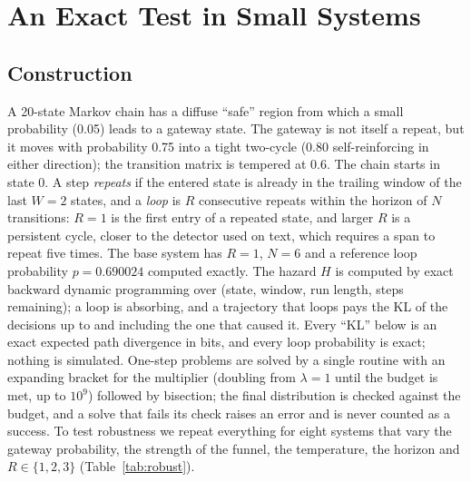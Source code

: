 \section{An Exact Test in Small Systems}\label{sec:small}

\subsection{Construction}
A 20-state Markov chain has a diffuse ``safe'' region from which a small probability (0.05) leads to a gateway state. The gateway is not itself a repeat, but it moves with probability 0.75 into a tight two-cycle (0.80 self-reinforcing in either direction); the transition matrix is tempered at 0.6. The chain starts in state 0. A step \emph{repeats} if the entered state is already in the trailing window of the last $W=2$ states, and a \emph{loop} is $R$ consecutive repeats within the horizon of $N$ transitions: $R=1$ is the first entry of a repeated state, and larger $R$ is a persistent cycle, closer to the detector used on text, which requires a span to repeat five times. The base system has $R=1$, $N=6$ and a reference loop probability $p=0.690024$ computed exactly. The hazard $H$ is computed by exact backward dynamic programming over (state, window, run length, steps remaining); a loop is absorbing, and a trajectory that loops pays the KL of the decisions up to and including the one that caused it. Every ``KL'' below is an exact expected path divergence in bits, and every loop probability is exact; nothing is simulated. One-step problems are solved by a single routine with an expanding bracket for the multiplier (doubling from $\lambda=1$ until the budget is met, up to $10^9$) followed by bisection; the final distribution is checked against the budget, and a solve that fails its check raises an error and is never counted as a success. To test robustness we repeat everything for eight systems that vary the gateway probability, the strength of the funnel, the temperature, the horizon and $R\in\{1,2,3\}$ (Table~\ref{tab:robust}).

